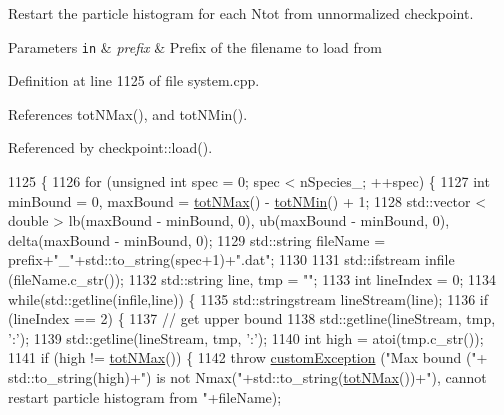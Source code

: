 Restart the particle histogram for each Ntot from unnormalized checkpoint. 


\begin{DoxyParams}[1]{Parameters}
\mbox{\tt in}  & {\em prefix} & Prefix of the filename to load from \\
\hline
\end{DoxyParams}


Definition at line 1125 of file system.\-cpp.



References tot\-N\-Max(), and tot\-N\-Min().



Referenced by checkpoint\-::load().


\begin{DoxyCode}
1125                                                           \{
1126     \textcolor{keywordflow}{for} (\textcolor{keywordtype}{unsigned} \textcolor{keywordtype}{int} spec = 0; spec < nSpecies\_; ++spec) \{
1127         \textcolor{keywordtype}{int} minBound = 0, maxBound = \hyperlink{classsim_system_aee2c65ecb43a35c0c4d070cdb45f7dc0}{totNMax}() - \hyperlink{classsim_system_af10842e0eaa638373b8717c87b47e6bc}{totNMin}() + 1;
1128         std::vector < double > lb(maxBound - minBound, 0), ub(maxBound - minBound, 0), delta(maxBound - 
      minBound, 0);
1129         std::string fileName = prefix+\textcolor{stringliteral}{"\_"}+std::to\_string(spec+1)+\textcolor{stringliteral}{".dat"};
1130 
1131         std::ifstream infile (fileName.c\_str());
1132         std::string line, tmp = \textcolor{stringliteral}{""};
1133         \textcolor{keywordtype}{int} lineIndex = 0;
1134         \textcolor{keywordflow}{while}(std::getline(infile,line)) \{
1135             std::stringstream lineStream(line);
1136             \textcolor{keywordflow}{if} (lineIndex == 2) \{
1137                 \textcolor{comment}{// get upper bound}
1138                 std::getline(lineStream, tmp, \textcolor{charliteral}{':'});
1139                 std::getline(lineStream, tmp, \textcolor{charliteral}{':'});
1140                 \textcolor{keywordtype}{int} high = atoi(tmp.c\_str());
1141                 \textcolor{keywordflow}{if} (high != \hyperlink{classsim_system_aee2c65ecb43a35c0c4d070cdb45f7dc0}{totNMax}()) \{
1142                     \textcolor{keywordflow}{throw} \hyperlink{classcustom_exception}{customException} (\textcolor{stringliteral}{"Max bound ("}+ std::to\_string(high)+\textcolor{stringliteral}{") is not
       Nmax("}+std::to\_string(\hyperlink{classsim_system_aee2c65ecb43a35c0c4d070cdb45f7dc0}{totNMax}())+\textcolor{stringliteral}{"), cannot restart particle histogram from "}+fileName);

\end{DoxyCode}
